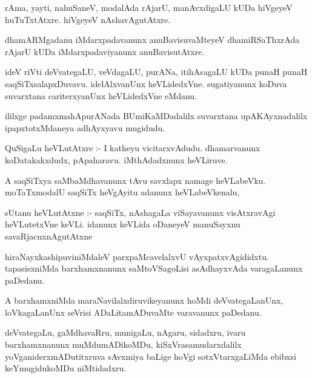 \documentclass{article}
\begin{document}
\begin{mn}
rAma, yayti, nahuSaneV, modalAda rAjarU, manAvxdigaLU kUDa hiVgeyeV huTuTxtAtxre.  
hiVgeyeV nAshavAgutAtxre.
\end{mn}

\begin{mn}
dhamARMgadanu iMdarxpadavanunx anuBavisuvaMteyeV dhamiRSaThxrAda rAjarU kUDa 
iMdarxpadaviyanunx anuBavisutAtxre. 
\end{mn}

\begin{mn}
ideV riVti deVvategaLU,  veVdagaLU, purANa, itihAsagaLU kUDa punaH  punaH  
saqSiTxsalapxDuvavu. idelAlxvanUnx heVLidedxVne.  sugatiyanunx koDuva 
suvarxtana cariterxyanUnx heVLidedxVne eMdanu. 
\end{mn}

\begin{mn}
ililxge padamxmahApurANada BUmiKaMDadalilx suvarxtana upAKAyxnadalilx 
ipapxtotxMdaneya adhAyxyavu mugidudu.
\end{mn}




\begin{mn}
QuSigaLu heVLutAtxre :- I katheyu vicitarxvAdudu. dhamarvanunx koDatakakxdudx, 
pApaharavu.  iMthAdadxnunx heVLiruve.
\end{mn}

\begin{mn}
A saqSiTxya saMbaMdhavanunx tAvu savxlapx namage heVLabeVku.  moTaTxmodalU 
saqSiTx heVgAyitu adanunx heVLabeVkenalu, 
\end{mn}

\begin{mn}
sUtanu heVLutAtxne :- saqSiTx, nAshagaLa viSayavanunx visAtxravAgi heVLutetxVne 
keVLi. idanunx keVLida oDaneyeV manuSayxnu savaRjacnxnAgutAtxne 
\end{mn}

\begin{mn}
hiraNayxkashipuviniMdaleV  parxpaMcavelalxvU vAyxpatxvAgididxtu. tapasisxniMda
 barxhamxnanunx saMtoVSagoLisi asAdhayxvAda varagaLanunx paDedanu. 
\end{mn}

\begin{mn}
A barxhamxniMda  maraNavilalxdiruvikeyanunx  hoMdi deVvategaLanUnx, 
loVkagaLanUnx seVrisi ADaLitamADuvaMte varavanunx paDedanu. 
\end{mn}

\begin{mn}
deVvategaLu, gaMdhavaRru, munigaLu, nAgaru, sidadxru, ivaru barxhamxnanunx 
muMdumADikoMDu, kiSxVrasamudarxdalilx  yoVganiderxmADutitxruva sAvxmiya 
baLige hoVgi sotxVtarxgaLiMda ebibxsi keYmugidukoMDu niMtidadxru.
\end{mn}
\end{document}
